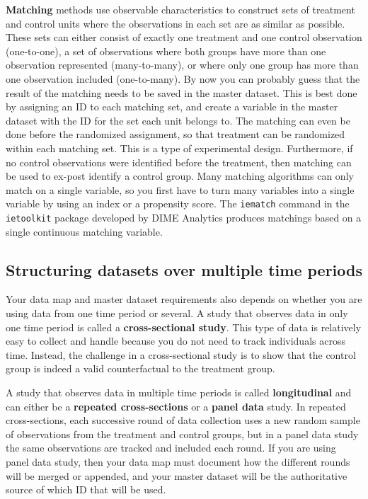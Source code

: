 \textbf{Matching}
methods use observable characteristics to construct
sets of treatment and control units
where the observations in each set 
are as similar as possible. 
These sets can either consist of exactly one treatment and one control observation (one-to-one),
a set of observations where
both groups have more than one observation represented (many-to-many),
or where only one group has more than one observation included (one-to-many).
By now you can probably guess that 
the result of the matching needs to be saved in the master dataset.
This is best done by assigning an ID to each matching set, 
and create a variable in the master dataset 
with the ID for the set each unit belongs to.
The matching can even be done before the randomized assignment,
so that treatment can be randomized within each matching set.
This is a type of experimental design.
Furthermore, if no control observations were identified before the treatment,
then matching can be used to ex-post identify a control group.
Many matching algorithms can only match on a single variable,
so you first have to turn many variables into a single variable
by using an index or a propensity score.
The \texttt{iematch}
command in the \texttt{ietoolkit} package developed by DIME Analytics
produces matchings based on a single continuous matching variable.

\subsection{Structuring datasets over multiple time periods}

Your data map and master dataset requirements also depends on
whether you are using data from one time period or several.
A study that observes data in only one time period is called
a \textbf{cross-sectional study}.
This type of data is relatively easy to collect and handle because
you do not need to track individuals across time.
Instead, the challenge in a cross-sectional study is to
show that the control group is indeed a valid counterfactual to the treatment group.

A study that observes data in multiple time periods is called \textbf{longitudinal}
and can either be a \textbf{repeated cross-sections}
or a \textbf{panel data} study. 
In repeated cross-sections,
each successive round of data collection uses a new random sample
of observations from the treatment and control groups,
but in a panel data study the same observations are tracked and included each round.
If you are using panel data study,
then your data map must document how the different rounds will be merged or appended,
and your master dataset will be the authoritative source of which ID that will be used. 

